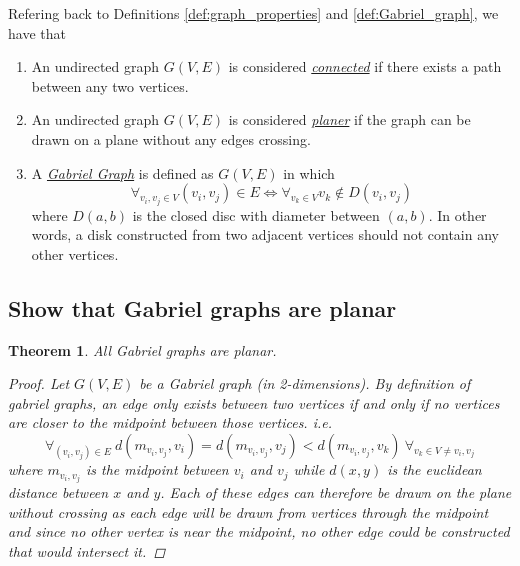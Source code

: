 \documentclass[]{article}
\numberwithin{equation}{section}
\newtheorem{theorem}{Theorem}
\begin{document}
Refering back to Definitions \ref*{def:graph_properties} and \ref*{def:Gabriel_graph}, we have that \begin{enumerate}
    \item An undirected graph $G(V,E)$ is considered \underline{\emph{connected}} if there exists a path between any two vertices.
    \item An undirected graph $G(V,E)$ is considered \underline{\emph{planer}} if the graph can be drawn on a plane without any edges crossing.
    \item A \emph{\underline{Gabriel Graph}} is defined as $G(V,E)$ in which \[
        \forall_{v_i, v_j \in V} (v_i,v_j) \in E \iff \forall_{v_k \in V} v_k \notin D(v_i,v_j)
    \] where $D(a,b)$ is the closed disc with diameter between $(a,b)$.
    In other words, a disk constructed from two adjacent vertices should not contain any other vertices.
\end{enumerate}


\subsection{Show that Gabriel graphs are planar}
\begin{theorem}
    All Gabriel graphs are planar. 
    \begin{proof}
        Let $G(V,E)$ be a Gabriel graph (in 2-dimensions). 
        By definition of gabriel graphs, an edge only exists between two vertices if and only if no vertices are closer to the midpoint between those vertices. 
        i.e.\[
            \forall_{(v_i, v_j) \in E} 
            \ d(m_{v_i,v_j}, v_i) = d(m_{v_i,v_j}, v_j) < d(m_{v_i,v_j}, v_k) 
            \ \forall_{v_k \in V \neq v_i, v_j}
        \] where $m_{v_i,v_j}$ is the midpoint between $v_i$ and $v_j$ while $d(x,y)$ is the euclidean distance between $x$ and $y$. 
        Each of these edges can therefore be drawn on the plane without crossing as each edge will be drawn from vertices through the midpoint and since no other vertex is near the midpoint, no other edge could be constructed that would intersect it. 
    \end{proof}
\end{theorem}

\end{document}
